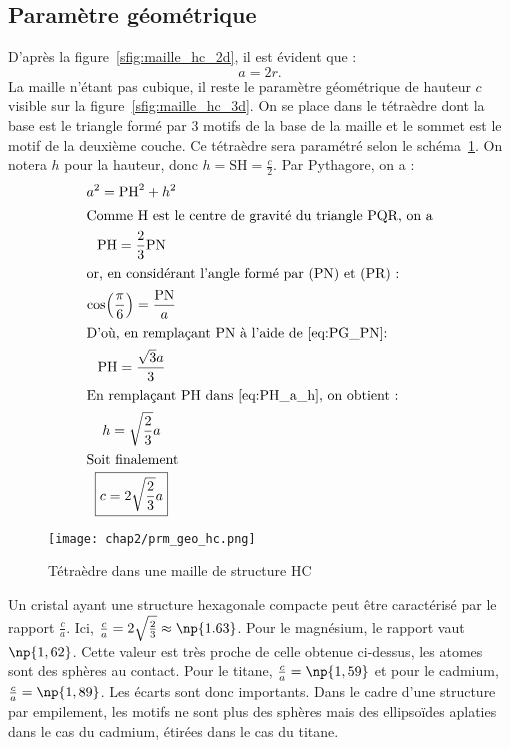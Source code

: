 \subsection{Paramètre géométrique}
D'après la figure~\ref{sfig:maille_hc_2d}, il est évident que :
\begin{equation}
    a = 2r\text{.} \label{eq;a_r_hc}
\end{equation}
La maille n'étant pas cubique, il reste le paramètre géométrique
de hauteur $c$ visible sur la figure~\ref{sfig:maille_hc_3d}.
On se place dans le tétraèdre dont la base est le triangle formé
par 3 motifs de la base de la maille et le sommet est le motif
de la deuxième couche. Ce tétraèdre sera paramétré selon le
schéma~\ref{fig:prm_geo_hc}.
On notera $h$ pour la hauteur, donc $h = \text{SH} = \frac{c}{2}$.
Par Pythagore, on a :
\begin{gather}
    a^2 = \text{PH}^2 + h^2 \label{eq:PH_a_h}\\
    \intertext{Comme H est le centre de gravité du triangle PQR, on a}
    \text{PH} = \frac{2}{3}\text{PN}\label{eq:PG_PN}\\
    \intertext{or, en considérant l'angle formé par (PN) et (PR) :}
    \cos\Bigl( \frac{\pi}{6}\Bigr) = \frac{\text{PN}}{a}\\
    \intertext{D'où, en remplaçant PN à l'aide de~\ref{eq:PG_PN}:}
    \text{PH} = \frac{\sqrt{3}a}{3}\label{eq:PH_a}\\
    \intertext{En remplaçant PH dans~\ref{eq:PH_a_h}, on obtient :}
    h = \sqrt{\frac{2}{3}}a\\
    \intertext{Soit finalement}
    \boxed{c=2\sqrt{\frac{2}{3}}a} \label{eq:c_hc}
\end{gather}
\begin{figure}
    \centering
    \texttt{[image: chap2/prm\_geo\_hc.png]}
    \caption{Tétraèdre dans une maille
        de structure HC}\label{fig:prm_geo_hc}
\end{figure}
\begin{rem}
    Un cristal ayant une structure hexagonale compacte
    peut être caractérisé par le rapport $\frac{c}{a}$.
    Ici, $\frac{c}{a} = 2\sqrt{\frac{2}{3}}\approx \np{1.63}$.
    Pour le magnésium, le rapport vaut
    $\np{1,62}$. Cette valeur est très proche de celle
    obtenue ci-dessus, les atomes sont des sphères
    au contact. Pour le titane,
    $\frac{c}{a}=\np{1,59}$ et pour le cadmium,
    $\frac{c}{a}=\np{1,89}$. Les écarts sont donc
    importants. Dans le cadre d’une structure par empilement,
    les motifs ne sont plus des sphères mais des ellipsoïdes
    aplaties dans le cas du cadmium, étirées dans le cas du titane.
\end{rem}

